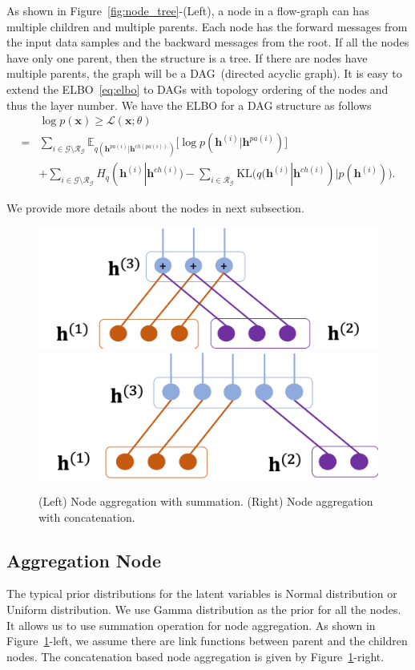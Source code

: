\documentclass[conference]{IEEEtran}
\begin{document}
As shown in Figure~\ref{fig:node_tree}-(Left), a node in a flow-graph can has multiple children and multiple parents. Each node has the forward messages from the input data samples and the backward messages from the root.  If all the nodes have only one parent, then the structure is a tree. If there are nodes have multiple parents, the graph will be a DAG~(directed acyclic graph). It is easy to extend the ELBO~\eqref{eq:elbo} to DAGs with topology ordering  of the nodes and thus the layer number. We have the ELBO for a DAG structure as follows
\begin{align*}  
& \log p(\mathbf{x}) \geqslant \mathcal{L}(\mathbf{x}; \theta) \\
=&   \sum_{i \in \mathcal{G}  \setminus  \mathcal{R}_{ \mathcal{G} }  }  \mathbb{E}_{q(\mathbf{h}^{pa(i)}|\mathbf{h}^{ch(pa(i))})} \bigg[ \log p( \mathbf{h}^{(i)}|  \mathbf{h}^{pa(i)})   \bigg]  \\
 & +  \sum_{i \in \mathcal{G}  \setminus  \mathcal{R}_{ \mathcal{G} }  } H_q(\mathbf{h}^{(i)} | \mathbf{h}^{ch(i)} )   -    \sum_{i \in  \mathcal{R}_{ \mathcal{G} }  }  \text{KL}\big(q(\mathbf{h}^{(i)} | \mathbf{h}^{ch(i)} )   | p(\mathbf{h}^{(i)})  \big) .  %
 \end{align*}

We provide more details about the nodes in next subsection.

\begin{figure}[!htbp] %
\begin{center}
 \includegraphics[width=0.43\linewidth]{fig/node_aggre_sum.png}
 \includegraphics[width=0.43\linewidth]{fig/node_aggre_cat.png}
\end{center}
   \caption{(Left) Node aggregation with summation. (Right) Node aggregation with concatenation. }
\label{fig:node_aggre}
\end{figure}

\subsection{Aggregation Node}
The typical prior distributions for the latent variables is Normal distribution or Uniform distribution. We use Gamma distribution as the prior for all the nodes.  It allows us to use summation operation for node aggregation.  As shown in Figure~\ref{fig:node_aggre}-left,  we assume there are link functions between  parent and the children nodes. The concatenation based node aggregation is given by Figure~\ref{fig:node_aggre}-right.
\end{document}
